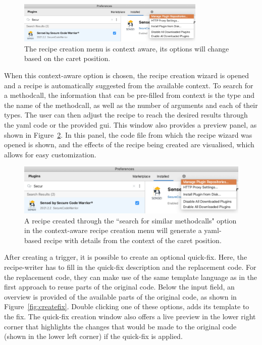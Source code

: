 \begin{figure}[t]
  \centering
  \includegraphics[width=0.8\textwidth,page=11]{04-tools/figures/figures2.pdf}
  \caption[Context-aware recipe creation menu]{The recipe creation menu is context aware, its options will change based on the caret position.}
  \label{fig:newrecipemethodcall} 
\end{figure}

When this context-aware option is chosen, the recipe creation wizard is opened and a recipe is automatically suggested from the available context.
To search for a methodcall, the information that can be pre-filled from context is the type and the name of the methodcall, as well as the number of arguments and each of their types.
The user can then adjust the recipe to reach the desired results through the \gls{yaml} code or the provided \gls{gui}.
This window also provides a preview panel, as shown in Figure~\ref{fig:recipewizard1}.
In this panel, the code file from which the recipe wizard was opened is shown, and the effects of the recipe being created are visualised, which allows for easy customization.

\begin{figure}
  \centering
  \includegraphics[width=\textwidth,page=10]{04-tools/figures/figures2.pdf}
  \caption[Recipe created from context]{A recipe created through the ``search for similar methodcalls" option in the context-aware recipe creation menu will generate a \gls{yaml}-based recipe with details from the context of the caret position.}
  \label{fig:recipewizard1} 
\end{figure}

After creating a trigger, it is possible to create an optional quick-fix.
Here, the recipe-writer has to fill in the quick-fix description and the replacement code.
For the replacement code, they can make use of the same template language as in the first approach to reuse parts of the original code.
Below the input field, an overview is provided of the available parts of the original code, as shown in Figure~\ref{fig:createfix}.
Double clicking one of these options, adds its template to the fix.
The quick-fix creation window also offers a live preview in the lower right corner that highlights the changes that would be made to the original code (shown in the lower left corner) if the quick-fix is applied.

